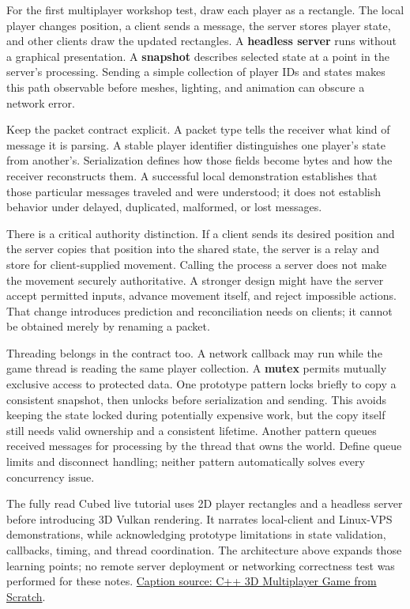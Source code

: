 \hypertarget{06-engine-ii-ch040-prove-a-connection-with-rectangles-before-adding-a-3d-renderer}{}

For the first multiplayer workshop test, draw each player as a rectangle. The local player changes position, a client sends a message, the server stores player state, and other clients draw the updated rectangles. A \textbf{headless server} runs without a graphical presentation. A \textbf{snapshot} describes selected state at a point in the server's processing. Sending a simple collection of player IDs and states makes this path observable before meshes, lighting, and animation can obscure a network error.

Keep the packet contract explicit. A packet type tells the receiver what kind of message it is parsing. A stable player identifier distinguishes one player's state from another's. Serialization defines how those fields become bytes and how the receiver reconstructs them. A successful local demonstration establishes that those particular messages traveled and were understood; it does not establish behavior under delayed, duplicated, malformed, or lost messages.

There is a critical authority distinction. If a client sends its desired position and the server copies that position into the shared state, the server is a relay and store for client-supplied movement. Calling the process a server does not make the movement securely authoritative. A stronger design might have the server accept permitted inputs, advance movement itself, and reject impossible actions. That change introduces prediction and reconciliation needs on clients; it cannot be obtained merely by renaming a packet.

Threading belongs in the contract too. A network callback may run while the game thread is reading the same player collection. A \textbf{mutex} permits mutually exclusive access to protected data. One prototype pattern locks briefly to copy a consistent snapshot, then unlocks before serialization and sending. This avoids keeping the state locked during potentially expensive work, but the copy itself still needs valid ownership and a consistent lifetime. Another pattern queues received messages for processing by the thread that owns the world. Define queue limits and disconnect handling; neither pattern automatically solves every concurrency issue.

The fully read Cubed live tutorial uses 2D player rectangles and a headless server before introducing 3D Vulkan rendering. It narrates local-client and Linux-VPS demonstrations, while acknowledging prototype limitations in state validation, callbacks, timing, and thread coordination. The architecture above expands those learning points; no remote server deployment or networking correctness test was performed for these notes. \href{https://www.youtube.com/watch?v=W1MSxy90BLg}{Caption source: C++ 3D Multiplayer Game from Scratch}.

